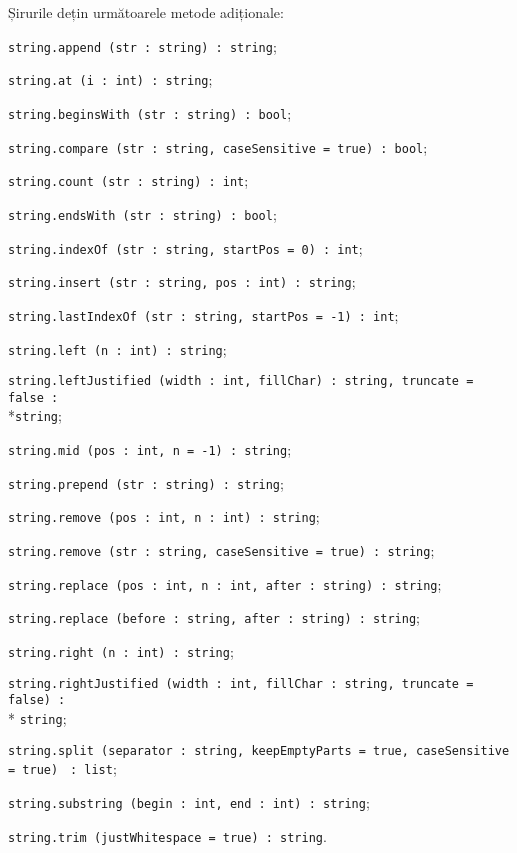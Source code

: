 Șirurile dețin următoarele metode adiționale:
\begin{icItems}
	\item
	\texttt{string.append (str : string) : string};
	\item
	\texttt{string.at (i : int) : string};
	\item
	\texttt{string.beginsWith (str : string) : bool};
	\item
	\texttt{string.compare (str : string, caseSensitive = true) : bool};
	\item
	\texttt{string.count (str : string) : int};
	\item
	\texttt{string.endsWith (str : string) : bool};
	\item
	\texttt{string.indexOf (str : string, startPos = 0) : int};
	\item
	\texttt{string.insert (str : string, pos : int) : string};
	\item
	\texttt{string.lastIndexOf (str : string, startPos = -1) : int};
	\item
	\texttt{string.left (n : int) : string};
	\item
	\texttt{string.leftJustified (width : int, fillChar) : string, truncate = false :}\\*\texttt{string};
	\item
	\texttt{string.mid (pos : int, n = -1) : string};
	\item
	\texttt{string.prepend (str : string) : string};
	\item
	\texttt{string.remove (pos : int, n : int) : string};
	\item
	\texttt{string.remove (str : string, caseSensitive = true) : string};
	\item
	\texttt{string.replace (pos : int, n : int, after : string) : string};
	\item
	\texttt{string.replace (before : string, after : string) : string};
	\item
	\texttt{string.right (n : int) : string};
	\item
	\texttt{string.rightJustified (width : int, fillChar : string, truncate = false) :}\\* \texttt{string};
	\item
	\texttt{string.split (separator : string, keepEmptyParts = true, caseSensitive = true) } \texttt{: list};
	\item
	\texttt{string.substring (begin : int, end : int) : string};
	\item
	\texttt{string.trim (justWhitespace = true) : string}.
\end{icItems}

